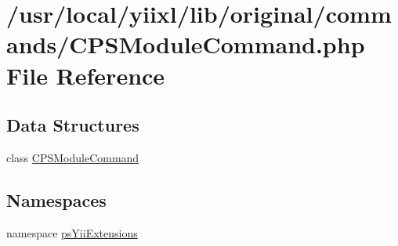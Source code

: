 \hypertarget{CPSModuleCommand_8php}{
\section{/usr/local/yiixl/lib/original/commands/CPSModuleCommand.php File Reference}
\label{CPSModuleCommand_8php}
}
\subsection*{Data Structures}
\begin{DoxyCompactItemize}
\item 
class \hyperlink{classCPSModuleCommand}{CPSModuleCommand}
\end{DoxyCompactItemize}
\subsection*{Namespaces}
\begin{DoxyCompactItemize}
\item 
namespace \hyperlink{namespacepsYiiExtensions}{psYiiExtensions}
\end{DoxyCompactItemize}
